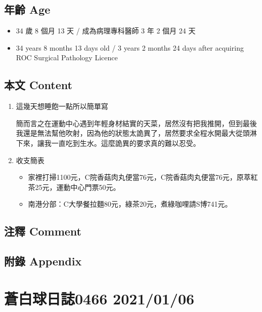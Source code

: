 \documentclass[a5paper, 10pt
]{book}
\providecommand{\tightlist}{%
  \setlength{\itemsep}{0pt}\setlength{\parskip}{0pt}}
\begin{document}
\hypertarget{ux5e74ux9f61-age-35}{%
\subsection{年齡 Age}\label{ux5e74ux9f61-age-35}}

\begin{itemize}
\tightlist
\item
  34 歲 8 個月 13 天 / 成為病理專科醫師 3 年 2 個月 24 天
\item
  34 years 8 months 13 days old / 3 years 2 months 24 days after
  acquiring ROC Surgical Pathology Licence
\end{itemize}

\hypertarget{ux672cux6587-content-35}{%
\subsection{本文 Content}\label{ux672cux6587-content-35}}

\begin{enumerate}
\def\labelenumi{\arabic{enumi}.}
\item
  這幾天想睡飽一點所以簡單寫

  簡而言之在運動中心遇到年輕身材結實的天菜，居然沒有把我推開，但到最後我還是無法幫他吹射，因為他的狀態太詭異了，居然要求全程水開最大從頭淋下來，讓我一直吃到生水。這麼詭異的要求真的難以忍受。
\item
  收支簡表

  \begin{itemize}
  \tightlist
  \item
    家裡打掃1100元，C院香菇肉丸便當76元，C院香菇肉丸便當76元，原萃紅茶25元，運動中心門票50元。
  \item
    南港分部：C大學餐拉麵80元，綠茶20元，煮綠咖哩請S博741元。
  \end{itemize}
\end{enumerate}

\hypertarget{ux6ce8ux91cb-comment-35}{%
\subsection{注釋 Comment}\label{ux6ce8ux91cb-comment-35}}

\hypertarget{ux9644ux9304-appendix-35}{%
\subsection{附錄 Appendix}\label{ux9644ux9304-appendix-35}}

\hypertarget{ux84bcux767dux7403ux65e5ux8a8c0466-20210106}{%
\section{蒼白球日誌0466
2021/01/06}\label{ux84bcux767dux7403ux65e5ux8a8c0466-20210106}}
\end{document}
